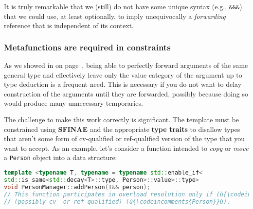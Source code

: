 \noindent It is truly remarkable that we (still) do not have some unique syntax
(e.g., \texttt{\&\&\&}) that we could use, at least optionally, to imply
unequivocally a \emph{forwarding} reference that is independent of its
context.

\subsubsection[Metafunctions are required in constraints]{Metafunctions are required in constraints}\label{metafunctions-are-required-in-constraints}

As we showed in \textit{} on page~\pageref{use-cases-forwardingref}, being able to
perfectly forward arguments of the same general type and effectively
leave only the value category of the argument up to type deduction is a frequent need. This
is necessary if you do not want to delay construction of the arguments
until they are forwarded, possibly because doing so would produce many
unnecessary temporaries.

The challenge to make this work correctly is significant. The template
must be constrained using \textbf{SFINAE} and the appropriate
\textbf{type traits} to disallow types that aren't some form of
cv-qualified or ref-qualified version of the type that you want to
accept. As an example, let's consider a function intended to \emph{copy}
or \emph{move} a \texttt{Person} object into a data structure:

\begin{lstlisting}[language=C++]
template <typename T, typename = typename std::enable_if<
std::is_same<std::decay<T>::type, Person>::value>::type>
void PersonManager::addPerson(T&& person);
// This function participates in overload resolution only if (ù{\codeincomments{T}}ù) is
// (possibly cv- or ref-qualified) (ù{\codeincomments{Person}}ù).
\end{lstlisting}

